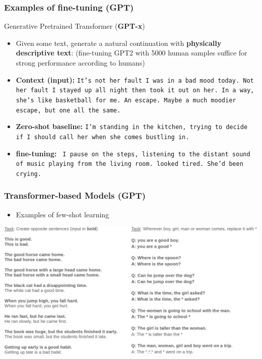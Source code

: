 \documentclass[10pt]{beamer}
\begin{document}
\begin{frame}
  \frametitle{Examples of fine-tuning (GPT)}
{\color{red}Generative Pretrained Transformer (\textbf{GPT-x})}
\begin{itemize}[<+->]
\item {\color{blue}{Task:}} Given some text, generate a natural continuation with \textbf{physically descriptive text}:
(fine-tuning GPT2 with 5000 human samples suffice for strong performance according to humans)
\item \textbf{Context (input):} \texttt{It’s not her fault I was in a bad mood today. Not her fault I stayed up all night then took it out on her.
In a way, she’s like basketball for me. An escape.
Maybe a much moodier escape, but one all the same.}
\item \textbf{Zero-shot baseline:}
\texttt{I’m standing in the kitchen, trying to decide if I should call her when she comes bustling in.}
\item \textbf{fine-tuning:}
\texttt{
I pause on the steps, listening to the distant sound of music playing from the living room.
looked tired. She’d been crying.}
\end{itemize}
\end{frame}


\begin{frame}
  \frametitle{Transformer-based Models (GPT)}
\begin{itemize}
\item Examples of few-shot learning
\end{itemize}
\begin{center}
	\includegraphics[width=.9\columnwidth]{images/zeroshot}
\end{center}
\end{frame}
\end{document}
